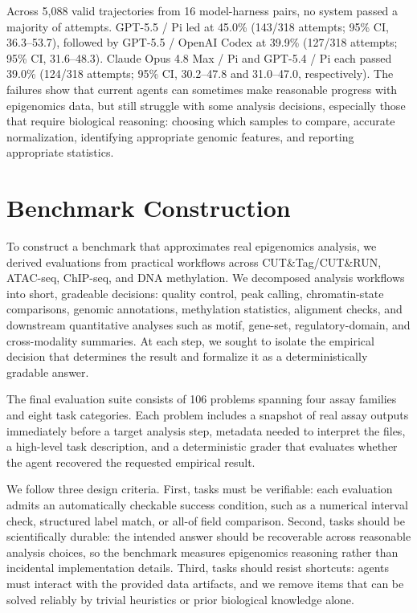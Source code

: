 \documentclass[10pt,letterpaper]{article}
\begin{document}
{\begin{minipage}[t]{0.47\textwidth}
\TwoColParaBreak
Across 5,088 valid trajectories from 16 model-harness pairs, no system passed
a majority of attempts. GPT-5.5 / Pi led at 45.0\% (143/318 attempts; 95\%
CI, 36.3--53.7), followed by GPT-5.5 / OpenAI Codex at 39.9\% (127/318
attempts; 95\% CI, 31.6--48.3). Claude Opus 4.8 Max / Pi and GPT-5.4 / Pi
each passed 39.0\% (124/318 attempts; 95\% CI, 30.2--47.8 and 31.0--47.0,
respectively). The failures show that current agents can sometimes make reasonable
progress with
epigenomics data, but still struggle with some analysis decisions, especially
those that require biological
reasoning: choosing which samples to compare, accurate normalization,
identifying appropriate genomic features, and reporting appropriate
statistics.

\end{minipage}\hfill
\begin{minipage}[t]{0.47\textwidth}
\setlength{\parskip}{0pt}
\setlength{\parindent}{0pt}

\section{Benchmark Construction}

To construct a benchmark that approximates real epigenomics analysis, we
derived evaluations from practical workflows across CUT\&Tag/CUT\&RUN,
ATAC-seq, ChIP-seq, and DNA methylation. We decomposed analysis workflows
into short, gradeable decisions: quality control, peak calling,
chromatin-state comparisons, genomic annotations, methylation statistics,
alignment checks, and downstream quantitative analyses such as motif,
gene-set, regulatory-domain, and cross-modality summaries. At each step, we
sought to isolate the empirical decision that determines the result and
formalize it as a deterministically gradable answer.

\TwoColParaBreak
The final evaluation suite consists of 106 problems spanning four assay
families and eight task categories. Each problem includes a snapshot of real
assay outputs immediately before a target analysis step, metadata needed to
interpret the files, a high-level task description, and a deterministic grader
that evaluates whether the agent recovered the requested empirical result.

\TwoColParaBreak
We follow three design criteria. First, tasks must be verifiable: each
evaluation admits an automatically checkable success condition, such as a
numerical interval check, structured label match, or all-of field comparison.
Second, tasks should be scientifically durable: the intended answer should be
recoverable across reasonable analysis choices, so the benchmark measures
epigenomics reasoning rather than incidental implementation details. Third,
tasks should resist shortcuts: agents must interact with the provided data
artifacts, and we remove items that can be solved reliably by trivial
heuristics or prior biological knowledge alone.


\end{minipage}}
\end{document}
